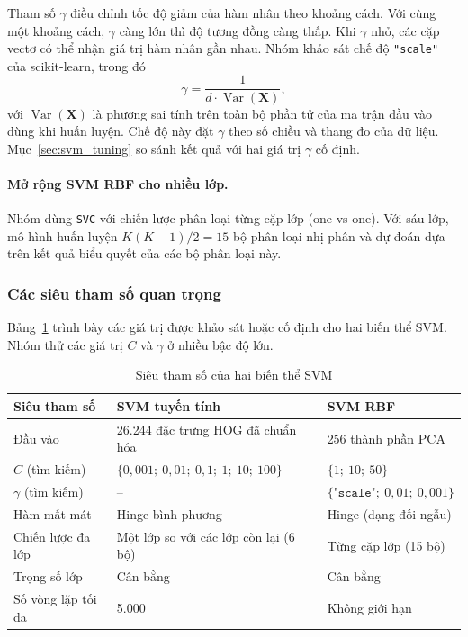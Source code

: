 Tham số $\gamma$ điều chỉnh tốc độ giảm của hàm nhân theo khoảng cách. Với cùng một khoảng cách, $\gamma$ càng lớn thì độ tương đồng càng thấp. Khi $\gamma$ nhỏ, các cặp vectơ có thể nhận giá trị hàm nhân gần nhau. Nhóm khảo sát chế độ \texttt{"scale"} của scikit-learn, trong đó
\begin{equation}
  \gamma = \frac{1}{d \cdot \operatorname{Var}(\mathbf{X})},
  \label{eq:gammascale}
\end{equation}
với $\operatorname{Var}(\mathbf{X})$ là phương sai tính trên toàn bộ phần tử của ma trận đầu vào dùng khi huấn luyện. Chế độ này đặt $\gamma$ theo số chiều và thang đo của dữ liệu. Mục~\ref{sec:svm_tuning} so sánh kết quả với hai giá trị $\gamma$ cố định.

\paragraph{Mở rộng SVM RBF cho nhiều lớp.} Nhóm dùng \texttt{SVC} với chiến lược phân loại từng cặp lớp (one-vs-one). Với sáu lớp, mô hình huấn luyện $K(K-1)/2 = 15$ bộ phân loại nhị phân và dự đoán dựa trên kết quả biểu quyết của các bộ phân loại này.

\subsubsection{Các siêu tham số quan trọng}

Bảng~\ref{tab:svm_hparams} trình bày các giá trị được khảo sát hoặc cố định cho hai biến thể SVM. Nhóm thử các giá trị $C$ và $\gamma$ ở nhiều bậc độ lớn.

\begin{table}[H]
\centering
\caption{Siêu tham số của hai biến thể SVM}
\label{tab:svm_hparams}
\small
\begin{tabularx}{\textwidth}{@{}l X X@{}}
\toprule
\textbf{Siêu tham số} & \textbf{SVM tuyến tính} & \textbf{SVM RBF} \\
\midrule
Đầu vào            & 26.244 đặc trưng HOG đã chuẩn hóa & 256 thành phần PCA \\
$C$ (tìm kiếm)     & $\{0{,}001;\ 0{,}01;\ 0{,}1;\ 1;\ 10;\ 100\}$ & $\{1;\ 10;\ 50\}$ \\
$\gamma$ (tìm kiếm) & -- & $\{\texttt{"scale"};\ 0{,}01;\ 0{,}001\}$ \\
Hàm mất mát        & Hinge bình phương & Hinge (dạng đối ngẫu) \\
Chiến lược đa lớp & Một lớp so với các lớp còn lại (6 bộ) & Từng cặp lớp (15 bộ) \\
Trọng số lớp       & Cân bằng & Cân bằng \\
Số vòng lặp tối đa & 5.000 & Không giới hạn \\
\bottomrule
\end{tabularx}
\end{table}


